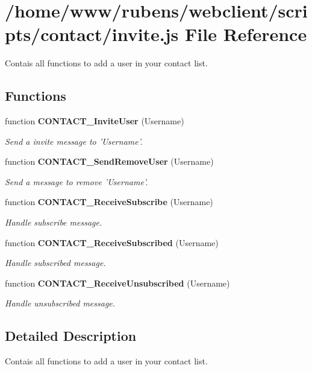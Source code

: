 \section{/home/www/rubens/webclient/scripts/contact/invite.js File Reference}
\label{invite_8js}
Contais all functions to add a user in your contact list. 

\subsection*{Functions}
\begin{CompactItemize}
\item 
function {\bf CONTACT\_\-InviteUser} (Username)
\begin{CompactList}\small\item\em Send a invite message to 'Username'. \item\end{CompactList}\item 
function {\bf CONTACT\_\-SendRemoveUser} (Username)
\begin{CompactList}\small\item\em Send a message to remove 'Username'. \item\end{CompactList}\item 
function {\bf CONTACT\_\-ReceiveSubscribe} (Username)
\begin{CompactList}\small\item\em Handle subscribe message. \item\end{CompactList}\item 
function {\bf CONTACT\_\-ReceiveSubscribed} (Username)
\begin{CompactList}\small\item\em Handle subscribed message. \item\end{CompactList}\item 
function {\bf CONTACT\_\-ReceiveUnsubscribed} (Username)
\begin{CompactList}\small\item\em Handle unsubscribed message. \item\end{CompactList}\end{CompactItemize}


\subsection{Detailed Description}
Contais all functions to add a user in your contact list. 

